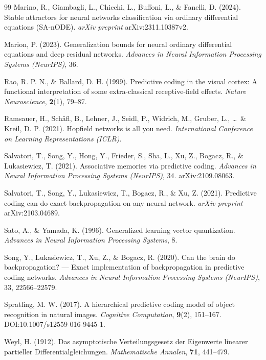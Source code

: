 \documentclass[11pt,a4paper]{article}
\begin{document}
\begin{thebibliography}{99}
Marino, R., Giambagli, L., Chicchi, L., Buffoni, L., \& Fanelli, D. (2024).
Stable attractors for neural networks classification via ordinary differential equations
(SA-nODE).
\textit{arXiv preprint} arXiv:2311.10387v2.

Marion, P. (2023).
Generalization bounds for neural ordinary differential equations and deep residual
networks.
\textit{Advances in Neural Information Processing Systems (NeurIPS)}, 36.

Rao, R. P. N., \& Ballard, D. H. (1999).
Predictive coding in the visual cortex: A functional interpretation of some
extra-classical receptive-field effects.
\textit{Nature Neuroscience}, \textbf{2}(1), 79--87.

Ramsauer, H., Sch\"{a}fl, B., Lehner, J., Seidl, P., Widrich, M., Gruber, L.,
\ldots\ \& Kreil, D. P. (2021).
Hopfield networks is all you need.
\textit{International Conference on Learning Representations (ICLR)}.

Salvatori, T., Song, Y., Hong, Y., Frieder, S., Sha, L., Xu, Z., Bogacz, R.,
\& Lukasiewicz, T. (2021).
Associative memories via predictive coding.
\textit{Advances in Neural Information Processing Systems (NeurIPS)}, 34.
arXiv:2109.08063.

Salvatori, T., Song, Y., Lukasiewicz, T., Bogacz, R., \& Xu, Z. (2021).
Predictive coding can do exact backpropagation on any neural network.
\textit{arXiv preprint} arXiv:2103.04689.

Sato, A., \& Yamada, K. (1996).
Generalized learning vector quantization.
\textit{Advances in Neural Information Processing Systems}, 8.

Song, Y., Lukasiewicz, T., Xu, Z., \& Bogacz, R. (2020).
Can the brain do backpropagation? --- Exact implementation of backpropagation in
predictive coding networks.
\textit{Advances in Neural Information Processing Systems (NeurIPS)}, 33, 22566--22579.

Spratling, M. W. (2017).
A hierarchical predictive coding model of object recognition in natural images.
\textit{Cognitive Computation}, \textbf{9}(2), 151--167.
DOI:10.1007/s12559-016-9445-1.

Weyl, H. (1912).
Das asymptotische Verteilungsgesetz der Eigenwerte linearer partieller
Differentialgleichungen.
\textit{Mathematische Annalen}, \textbf{71}, 441--479.


\end{thebibliography}
\end{document}
